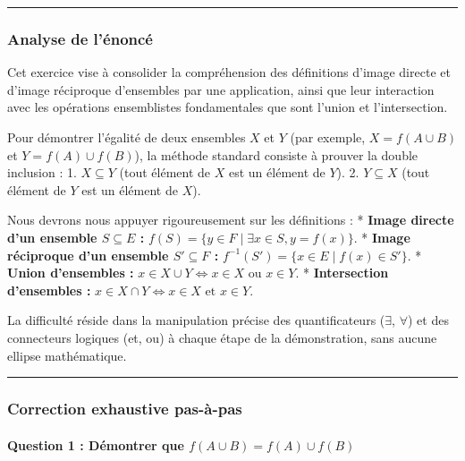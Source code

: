 \documentclass[12pt,a4paper]{report}
\begin{document}
\begin{center}\rule{0.5\linewidth}{0.5pt}\end{center}

\subsubsection{Analyse de l'énoncé}\label{analyse-de-luxe9noncuxe9}

Cet exercice vise à consolider la compréhension des définitions d'image
directe et d'image réciproque d'ensembles par une application, ainsi que
leur interaction avec les opérations ensemblistes fondamentales que sont
l'union et l'intersection.

Pour démontrer l'égalité de deux ensembles \(X\) et \(Y\) (par exemple,
\(X = f(A \cup B)\) et \(Y = f(A) \cup f(B)\)), la méthode standard
consiste à prouver la double inclusion : 1. \(X \subseteq Y\) (tout
élément de \(X\) est un élément de \(Y\)). 2. \(Y \subseteq X\) (tout
élément de \(Y\) est un élément de \(X\)).

Nous devrons nous appuyer rigoureusement sur les définitions : *
\textbf{Image directe d'un ensemble \(S \subseteq E\) :}
\(f(S) = \{y \in F \mid \exists x \in S, y = f(x)\}\). * \textbf{Image
réciproque d'un ensemble \(S' \subseteq F\) :}
\(f^{-1}(S') = \{x \in E \mid f(x) \in S'\}\). * \textbf{Union
d'ensembles :} \(x \in X \cup Y \iff x \in X \text{ ou } x \in Y\). *
\textbf{Intersection d'ensembles :}
\(x \in X \cap Y \iff x \in X \text{ et } x \in Y\).

La difficulté réside dans la manipulation précise des quantificateurs
(\(\exists\), \(\forall\)) et des connecteurs logiques (et, ou) à chaque
étape de la démonstration, sans aucune ellipse mathématique.

\begin{center}\rule{0.5\linewidth}{0.5pt}\end{center}

\subsubsection{Correction exhaustive
pas-à-pas}\label{correction-exhaustive-pas-uxe0-pas}

\paragraph{\texorpdfstring{Question 1 : Démontrer que
\(f(A \cup B) = f(A) \cup f(B)\)}{Question 1 : Démontrer que f(A \textbackslash cup B) = f(A) \textbackslash cup f(B)}}\label{question-1-duxe9montrer-que-fa-cup-b-fa-cup-fb}
\end{document}
